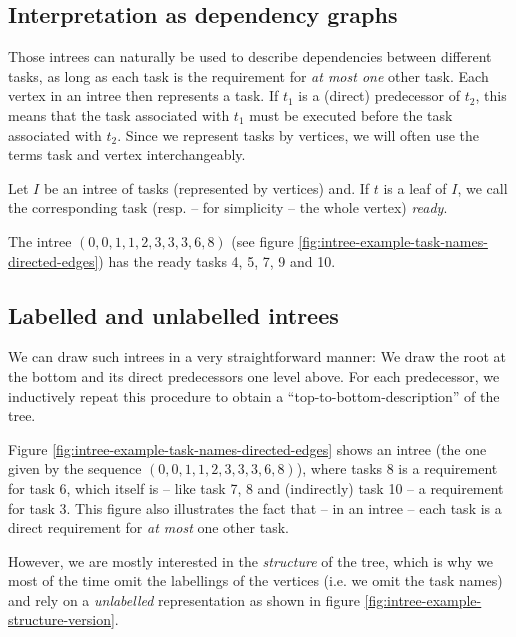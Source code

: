 \subsection{Interpretation as dependency graphs}
\label{sec:intrees-interpreted-as-dependency-graphs}

Those intrees can naturally be used to describe dependencies between different tasks, as long as each task is the requirement for \emph{at most one} other task. Each vertex in an intree then represents a task. If $t_1$ is a (direct) predecessor of $t_2$, this means that the task associated with $t_1$ must be executed before the task associated with $t_2$. Since we represent tasks by vertices, we will often use the terms task and vertex interchangeably.


\begin{definition}
  Let $I$ be an intree of tasks (represented by vertices) and. If $t$ is a leaf of $I$, we call the corresponding task (resp. -- for simplicity -- the whole vertex) \emph{ready}.
\end{definition}

The intree $(0,0,1,1,2,3,3,3,6,8)$ (see figure \ref{fig:intree-example-task-names-directed-edges}) has the ready tasks 4, 5, 7, 9 and 10.

\subsection{Labelled and unlabelled intrees}
\label{sec:intrees-labelled-unlabelled}

We can draw such intrees in a very straightforward manner: We draw the root at the bottom and its direct predecessors one level above. For each predecessor, we inductively repeat this procedure to obtain a ``top-to-bottom-description'' of the tree.

Figure \ref{fig:intree-example-task-names-directed-edges} shows an intree (the one given by the sequence $(0,0,1,1,2,3,3,3,6,8)$), where tasks 8 is a requirement for task 6, which itself is -- like task 7, 8 and (indirectly) task 10 -- a requirement for task 3. This figure also illustrates the fact that -- in an intree -- each task is a direct requirement for \emph{at most} one other task.

However, we are mostly interested in the \emph{structure} of the tree, which is why we most of the time omit the labellings of the vertices (i.e. we omit the task names) and rely on a \emph{unlabelled} representation as shown in figure \ref{fig:intree-example-structure-version}. 

